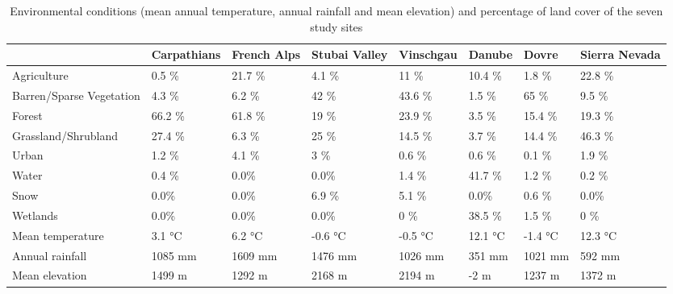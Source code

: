 \begin{table}[ht]
\centering
\caption{Environmental conditions (mean annual temperature, annual rainfall and mean elevation) and percentage of land cover of the seven study sites} 
\label{table_sites}
\begingroup\small
\begin{tabular}{llllllll}
  & Carpathians & French Alps & Stubai Valley & Vinschgau & Danube & Dovre & Sierra Nevada \\ 
  \hline
Agriculture & 0.5 \% & 21.7 \% & 4.1 \% & 11 \% & 10.4 \% & 1.8 \% & 22.8 \% \\ 
  Barren/Sparse Vegetation & 4.3 \% & 6.2 \% & 42 \% & 43.6 \% & 1.5 \% & 65 \% & 9.5 \% \\ 
  Forest & 66.2 \% & 61.8 \% & 19 \% & 23.9 \% & 3.5 \% & 15.4 \% & 19.3 \% \\ 
   \hline
Grassland/Shrubland & 27.4 \% & 6.3 \% & 25 \% & 14.5 \% & 3.7 \% & 14.4 \% & 46.3 \% \\ 
  Urban & 1.2 \% & 4.1 \% & 3 \% & 0.6 \% & 0.6 \% & 0.1 \% & 1.9 \% \\ 
  Water & 0.4 \% & 0.0\% & 0.0\% & 1.4 \% & 41.7 \% & 1.2 \% & 0.2 \% \\ 
  Snow & 0.0\% & 0.0\% & 6.9 \% & 5.1 \% & 0.0\% & 0.6 \% & 0.0\% \\ 
  Wetlands & 0.0\% & 0.0\% & 0.0\% & 0 \% & 38.5 \% & 1.5 \% & 0 \% \\ 
  Mean temperature & 3.1 °C & 6.2 °C & -0.6 °C & -0.5 °C & 12.1 °C & -1.4 °C & 12.3 °C \\ 
  Annual rainfall & 1085 mm & 1609 mm & 1476 mm & 1026 mm & 351 mm & 1021 mm & 592 mm \\ 
  Mean elevation & 1499 m & 1292 m & 2168 m & 2194 m & -2 m & 1237 m & 1372 m \\ 
   \hline
\end{tabular}
\endgroup
\end{table}

